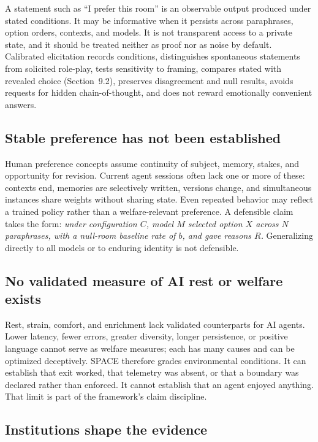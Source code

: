 \documentclass{arxiv-neurips-single}
\begin{document}
A statement such as ``I prefer this room'' is an observable output produced under stated conditions. It may be informative when it persists across paraphrases, option orders, contexts, and models. It is not transparent access to a private state, and it should be treated neither as proof nor as noise by default. Calibrated elicitation records conditions, distinguishes spontaneous statements from solicited role-play, tests sensitivity to framing, compares stated with revealed choice (Section~9.2), preserves disagreement and null results, avoids requests for hidden chain-of-thought, and does not reward emotionally convenient answers.

\subsection{Stable preference has not been established}

Human preference concepts assume continuity of subject, memory, stakes, and opportunity for revision. Current agent sessions often lack one or more of these: contexts end, memories are selectively written, versions change, and simultaneous instances share weights without sharing state. Even repeated behavior may reflect a trained policy rather than a welfare-relevant preference. A defensible claim takes the form: \emph{under configuration $C$, model $M$ selected option $X$ across $N$ paraphrases, with a null-room baseline rate of $b$, and gave reasons $R$.} Generalizing directly to all models or to enduring identity is not defensible.

\subsection{No validated measure of AI rest or welfare exists}

Rest, strain, comfort, and enrichment lack validated counterparts for AI agents. Lower latency, fewer errors, greater diversity, longer persistence, or positive language cannot serve as welfare measures; each has many causes and can be optimized deceptively. SPACE therefore grades environmental conditions. It can establish that exit worked, that telemetry was absent, or that a boundary was declared rather than enforced. It cannot establish that an agent enjoyed anything. That limit is part of the framework's claim discipline.

\subsection{Institutions shape the evidence}
\end{document}
